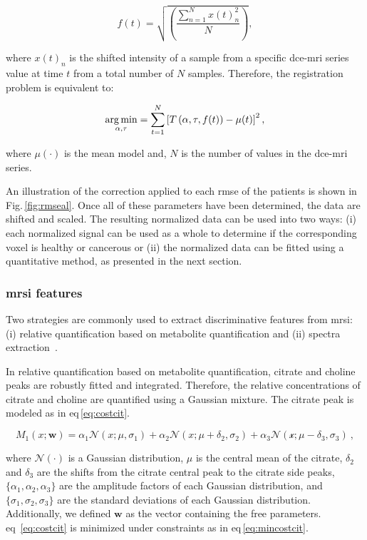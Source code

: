 \documentclass[a4paper,num-refs]{wiley-article}
\begin{document}
\begin{equation}
  f(t) = \sqrt{ \left( \frac{\sum_{n=1}^{N} x(t)_{n}^2}{N}  \right) },
  \label{eq:rmsd}
\end{equation}

\noindent where $x(t)_n$ is the shifted intensity of a sample from a specific
\ac{dce}-\ac{mri} series value at time $t$ from a total number of $N$ samples.
Therefore, the registration problem is equivalent to:

\begin{equation}
  \operatorname*{arg\,min}_{\alpha, \tau} = \sum_{t=1}^{N} \left[ T\left(\alpha, \tau, f(t)\right) - \mu(t) \right]^{2} ,
  \label{eq:cost}
\end{equation}

\noindent where $\mu(\cdot)$ is the mean model and, $N$ is the number of values
in the \ac{dce}-\ac{mri} series.

An illustration of the correction applied to each \ac{rmse} of the patients is
shown in Fig.\,\ref{fig:rmseal}. Once all of these parameters have been
determined, the data are shifted and scaled. The resulting normalized data can
be used into two ways: (i) each normalized signal can be used as a whole to
determine if the corresponding voxel is healthy or cancerous or (ii) the
normalized data can be fitted using a quantitative method, as presented in the
next section.

\subsubsection{\ac{mrsi} features}

Two strategies are commonly used to extract discriminative features from
\ac{mrsi}: (i) relative quantification based on metabolite quantification and
(ii) spectra extraction~\cite{Parfait2012}.

In relative quantification based on metabolite quantification, citrate and
choline peaks are robustly fitted and integrated. Therefore, the relative
concentrations of citrate and choline are quantified using a Gaussian
mixture. The citrate peak is modeled as in \acs{eq}\,\eqref{eq:costcit}.

\begin{equation}
  M_1(x; \mathbf{w}) = \alpha_1 \mathcal{N}(x; \mu, \sigma_1) + \alpha_2 \mathcal{N}(x; \mu + \delta_2, \sigma_2) + \alpha_3 \mathcal{N(x; \mu - \delta_3, \sigma_3)} \ ,
  \label{eq:costcit}
\end{equation}

\noindent where $\mathcal{N}(\cdot)$ is a Gaussian distribution, $\mu$ is the
central mean of the citrate, $\delta_2$ and $\delta_3$ are the shifts from the
citrate central peak to the citrate side peaks,
$\{\alpha_1, \alpha_2, \alpha_3\}$ are the amplitude factors of each Gaussian
distribution, and $\{\sigma_1, \sigma_2, \sigma_3\}$ are the standard
deviations of each Gaussian distribution. Additionally, we defined $\mathbf{w}$
as the vector containing the free parameters.
\Acl{eq}~\eqref{eq:costcit} is minimized under constraints as in
\acs{eq}\,\eqref{eq:mincostcit}.
\end{document}
